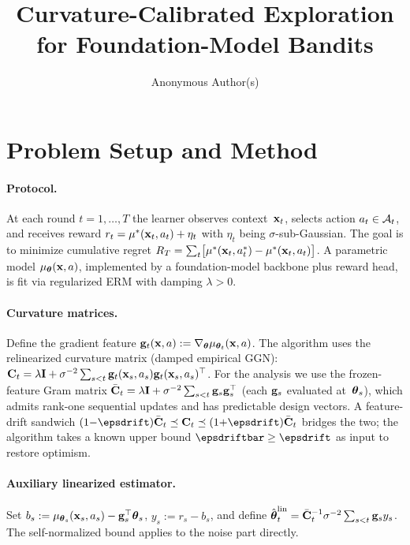 \documentclass[11pt]{article}
\title{Curvature-Calibrated Exploration for Foundation-Model Bandits\\
     }
\author{Anonymous Author(s)}
\begin{document}
\maketitle

\section{Problem Setup and Method}

\paragraph{Protocol.}
At each round $t=1,\dots,T$ the learner observes context~$\mathbf{x}_t$, selects
action $a_t\in\mathcal{A}_t$, and receives reward
$r_t=\mu^*(\mathbf{x}_t,a_t)+\eta_t$ with $\eta_t$ being $\sigma$-sub-Gaussian.
The goal is to minimize cumulative regret
$R_T=\sum_{t}\bigl[\mu^*(\mathbf{x}_t,a_t^*)-\mu^*(\mathbf{x}_t,a_t)\bigr]$.
A parametric model $\mu_{\boldsymbol{\theta}}(\mathbf{x},a)$, implemented by a foundation-model
backbone plus reward head, is fit via regularized ERM with damping
$\lambda>0$.

\paragraph{Curvature matrices.}
Define the gradient feature $\mathbf{g}_t(\mathbf{x},a):=\nabla_{\boldsymbol{\theta}}\mu_{\boldsymbol{\theta}_t}(\mathbf{x},a)$.
The algorithm uses the relinearized curvature matrix (damped empirical GGN):
$\mathbf{C}_t = \lambda\mathbf{I} + \sigma^{-2}\sum_{s<t}\mathbf{g}_t(\mathbf{x}_s,a_s)\mathbf{g}_t(\mathbf{x}_s,a_s)^\top$.
For the analysis we use the frozen-feature Gram matrix
$\bar{\mathbf{C}}_t = \lambda\mathbf{I} + \sigma^{-2}\sum_{s<t}\mathbf{g}_s\mathbf{g}_s^\top$
(each $\mathbf{g}_s$ evaluated at~$\boldsymbol{\theta}_s$), which admits rank-one sequential
updates and has predictable design vectors.
A feature-drift sandwich
$(1{-}\epsdrift)\bCbar_t\preceq\bC_t\preceq(1{+}\epsdrift)\bCbar_t$
bridges the two; the algorithm takes a known upper bound $\epsdriftbar
\ge\epsdrift$ as input to restore optimism.

\paragraph{Auxiliary linearized estimator.}
Set $b_s:=\mu_{\boldsymbol{\theta}_s}(\mathbf{x}_s,a_s)-\mathbf{g}_s^\top\boldsymbol{\theta}_s$,
$y_s:=r_s-b_s$, and define
$\hat{\boldsymbol{\theta}}_t^{\mathrm{lin}}=\bar{\mathbf{C}}_t^{-1}\sigma^{-2}\sum_{s<t}\mathbf{g}_s y_s$.
The self-normalized bound applies to the noise part directly.
\end{document}
